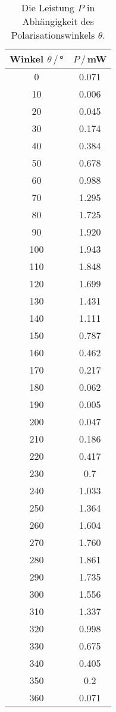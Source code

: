 \begin{table}[H]
    \center
    \caption{Die Leistung $P$ in Abhängigkeit des Polarisationswinkels $\theta$.}
    \begin{tabular}{c c}
        \toprule
        Winkel $\theta\,/\,$° & $P\,/\,$mW\\
        \midrule
        0&       0.071\\
        10&      0.006\\
        20&      0.045\\
        30&      0.174\\
        40&      0.384\\
        50&      0.678\\
        60&      0.988\\
        70&      1.295\\
        80&      1.725\\
        90&      1.920\\
        100&     1.943\\
        110&     1.848\\
        120&     1.699\\
        130&     1.431\\
        140&     1.111\\
        150&     0.787\\
        160&     0.462\\
        170&     0.217\\
        180&     0.062\\
        190&     0.005\\
        200&     0.047\\
        210&     0.186\\
        220&     0.417\\
        230&     0.7  \\
        240&     1.033\\
        250&     1.364\\
        260&     1.604\\
        270&     1.760\\
        280&     1.861\\
        290&    1.735\\
        300&     1.556\\
        310&     1.337\\
        320&     0.998\\
        330&     0.675\\
        340&     0.405\\
        350&     0.2\\
        360&     0.071\\        
        \bottomrule
    \end{tabular}
    \label{tab:pol}
\end{table}
\label{sec:Anhang}